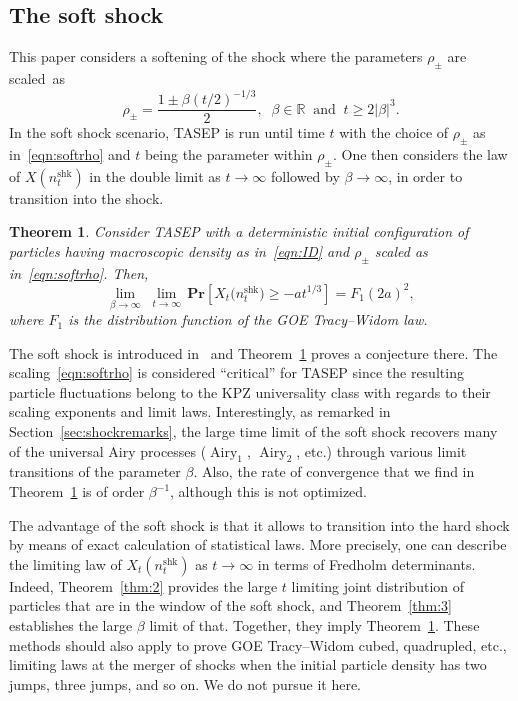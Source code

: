 \documentclass[10pt]{amsart}
\newtheorem{theo}{Theorem}[section]
\theoremstyle{definition}\newtheorem{defi}[theo]{Definition}\newtheorem{rema}[theo]{Remark}\newtheorem{exam}[theo]{Example}\newtheorem{exem}[theo]{Example}\newtheorem{nota}[theo]{Notation}
\DeclareMathOperator{\airy}{Airy}
\DeclareMathOperator{\shk}{shk}
\newcommand{\pr}[1]{\mathbf{Pr}\left[#1\right]}
\newcommand{\R}{\mathbb{R}}
\begin{document}
\subsection{The soft shock} This paper considers a softening of the shock where the parameters $\rho_{\pm}$ are scaled~as
\begin{equation}\label{eqn:softrho}
\rho_{\pm} = \frac{1 \pm \beta (t / 2)^{-1/3}}{2},\;\; \beta \in \R \;\;\text{and}\;\; t \geq 2|\beta|^{3}.
\end{equation}
In the soft shock scenario, TASEP is run until time $t$ with the choice of $\rho_{\pm}$ as in~\eqref{eqn:softrho} and $t$ being the parameter within $\rho_{\pm}$. One then considers the law of $X(n^{\shk}_t)$ in the double limit as $t \to \infty$ followed by $\beta \to \infty$, in order to transition into the shock.

\begin{theo} \label{thm:1}
Consider TASEP with a deterministic initial configuration of particles having macroscopic density as in~\eqref{eqn:ID} and $\rho_{\pm}$ scaled as in~\eqref{eqn:softrho}. Then,
\[
\lim_{\beta \to \infty}\; \lim_{t \to \infty}\, \pr{X_t \big(n^{\shk}_t \big) \geq - a t^{1/3}} = F_1(2a)^2,
\]
where $F_1$ is the distribution function of the GOE Tracy--Widom law.
\end{theo}

The soft shock is introduced in~\cite{FN2} and Theorem~\ref{thm:1} proves a conjecture there. The scaling~\eqref{eqn:softrho} is considered ``critical'' for TASEP since the resulting particle fluctuations belong to the KPZ universality class with regards to their scaling exponents and limit laws. Interestingly, as remarked in Section~\ref{sec:shockremarks}, the large time limit of the soft shock recovers many of the universal Airy processes ($\airy_1$, $\airy_2$, etc.) through various limit transitions of the parameter $\beta$. Also, the rate of convergence that we find in Theorem~\ref{thm:1} is of order $\beta^{-1}$, although this is not optimized.

The advantage of the soft shock is that it allows to transition into the hard shock by means of exact calculation of statistical laws. More precisely, one can describe the limiting law of $X_t(n^{\shk}_t)$ as $t \to \infty$ in terms of Fredholm determinants. Indeed, Theorem~\ref{thm:2} provides the large $t$ limiting joint distribution of particles that are in the window of the soft shock, and Theorem~\ref{thm:3} establishes the large $\beta$ limit of that. Together, they imply Theorem~\ref{thm:1}. These methods should also apply to prove GOE Tracy--Widom cubed, quadrupled, etc., limiting laws at the merger of shocks when the initial particle density has two jumps, three jumps, and so on. We do not pursue it here.
\end{document}
